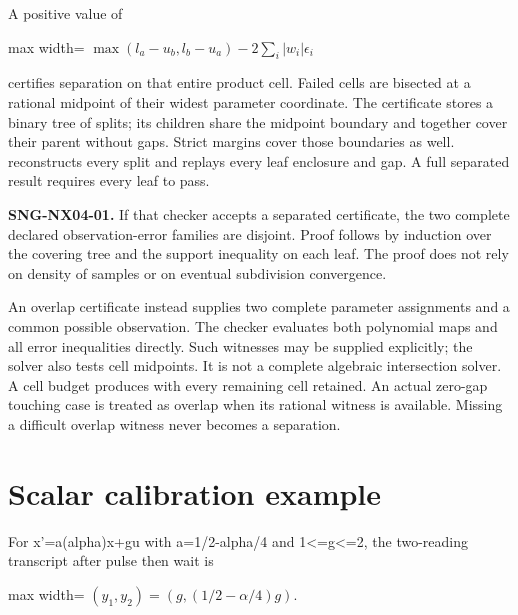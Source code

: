 \documentclass[
  11pt,
  a4paper,
]{report}
\let\singularitytexttt\texttt
\renewcommand{\texttt}[1]{\singularitytexttt{\seqsplit{#1}}}
\begin{document}
A positive value of

\begin{center}
\begin{adjustbox}{max width=\linewidth}
$\displaystyle
\max(l_a-u_b,l_b-u_a)-2\sum_i|w_i|\epsilon_i
$
\end{adjustbox}
\end{center}

certifies separation on that entire product cell. Failed cells are
bisected at a rational midpoint of their widest parameter coordinate.
The certificate stores a binary tree of splits; its children share the
midpoint boundary and together cover their parent without gaps. Strict
margins cover those boundaries as well.
\texttt{verify\_family\_certificate} reconstructs every split and
replays every leaf enclosure and gap. A full separated result requires
every leaf to pass.

\textbf{SNG-NX04-01.} If that checker accepts a separated certificate,
the two complete declared observation-error families are disjoint. Proof
follows by induction over the covering tree and the support inequality
on each leaf. The proof does not rely on density of samples or on
eventual subdivision convergence.

An overlap certificate instead supplies two complete parameter
assignments and a common possible observation. The checker evaluates
both polynomial maps and all error inequalities directly. Such witnesses
may be supplied explicitly; the solver also tests cell midpoints. It is
not a complete algebraic intersection solver. A cell budget produces
\texttt{unresolved} with every remaining cell retained. An actual
zero-gap touching case is treated as overlap when its rational witness
is available. Missing a difficult overlap witness never becomes a
separation.

\hypertarget{scalar-calibration-example}{%
\section{Scalar calibration example}\label{scalar-calibration-example}}

For x'=a(alpha)x+gu with a=1/2-alpha/4 and 1\textless=g\textless=2, the
two-reading transcript after pulse then wait is

\begin{center}
\begin{adjustbox}{max width=\linewidth}
$\displaystyle
(y_1,y_2)=(g,(1/2-\alpha/4)g).
$
\end{adjustbox}
\end{center}
\end{document}
